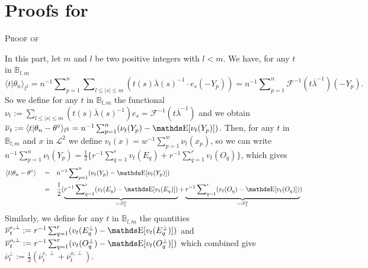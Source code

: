  \section{Proofs for }

\begin{pro}{\textsc{Proof of }\\}\label{PRO_FREQ_CIRCDECONV_KNOWN_BETA_ORACLE_NP_SPLITBETA}

In this part, let $m$ and $l$ be two positive integers with $l < m$.
We have, for any $t$ in $\mathds{B}_{l, m}$
\[\langle t \vert \theta_{n} \rangle_{l^{2}} = n^{-1} \sum\nolimits_{p = 1}^{n} \sum\nolimits_{l \leq \vert s \vert \leq m} (t(s)\overline{\lambda}(s)^{-1} \cdot e_{s}(- Y_{p})) = n^{-1} \sum\nolimits_{p = 1}^{n} \mathcal{F}^{-1}(t \overline{\lambda}^{-1})(- Y_{p}).\]
So we define for any $t$ in $\mathds{B}_{l, m}$ the functional $\nu_{t} := \sum\nolimits_{l \leq \vert s \vert \leq m} (t(s)\overline{\lambda}(s)^{-1}) e_{s} = \mathcal{F}^{-1}(t\overline{\lambda}^{-1})$ and we obtain $\overline{\nu}_{t} := \langle t \vert \theta_{n} - \theta^{\circ} \rangle_{l^{2}} = n^{-1} \sum\nolimits_{p = 1}^{n} (\nu_{t}(Y_{p}) - \E[\nu_{t}(Y_{p})])$.
Then, for any $t$ in $\mathds{B}_{l, m}$ and $x$ in $\mathcal{L}^{2}$ we define $v_{t}(x) = w^{-1}  \sum\nolimits_{p = 1}^{w} \nu_{t}(x_{p})$, so we can write $n^{-1} \sum\nolimits_{p = 1}^{n} \nu_{t}(Y_{p}) = \frac{1}{2} \{ r^{-1}  \sum\nolimits_{q = 1}^{r} v_{t}(E_{q}) +  r^{-1}  \sum\nolimits_{q = 1}^{r} v_{t}(O_{q}) \}$, which gives
\begin{alignat*}{3}
& \langle t \vert \theta_{n} - \theta^{\circ}\rangle && = && n^{-1} \sum\nolimits_{p = 1}^{n} (\nu_{t}(Y_{p}) - \E[\nu_{t}(Y_{p})])\\
& && = && \frac{1}{2} (\underbrace{ r^{-1}  \sum\nolimits_{q = 1}^{r} (v_{t}(E_{q})- \E[v_{t}(E_{q})])}_{=: \overline{\nu}_{t}^{e}} + \underbrace{ r^{-1}  \sum\nolimits_{q = 1}^{r} (v_{t}(O_{q})- \E[v_{t}(O_{q})])}_{=: \overline{\nu}_{t}^{o}})
\end{alignat*}
Similarly, we define for any $t$ in $\mathds{B}_{l, m}$ the quantities $\overline{\nu}_{t}^{e, \perp} :=  r^{-1}  \sum\nolimits_{q = 1}^{r} (v_{t}(E_{q}^{\perp})- \E[v_{t}(E_{q}^{\perp})])$ and $\overline{\nu}_{t}^{o, \perp} :=  r^{-1}  \sum\nolimits_{q = 1}^{r} (v_{t}(O_{q}^{\perp})- \E[v_{t}(O_{q}^{\perp})])$ which combined give $\overline{\nu}_{t}^{\perp} := \frac{1}{2} (\overline{\nu}_{t}^{e, \perp} + \overline{\nu}_{t}^{o, \perp})$.


\end{pro}
